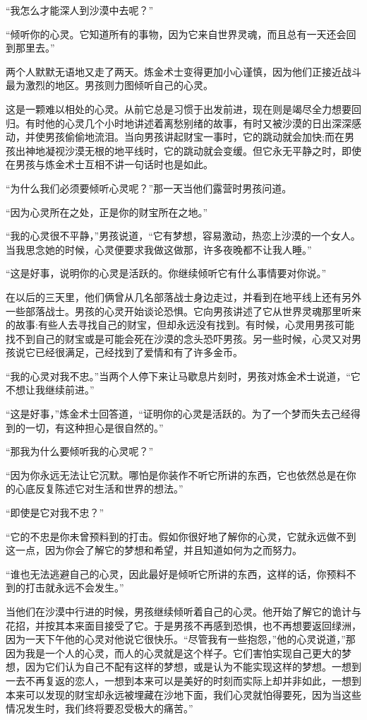 \documentclass[twoside,openany]{book}
\begin{document}
“我怎么才能深人到沙漠中去呢？”

“倾听你的心灵。它知道所有的事物，因为它来自世界灵魂，而且总有一天还会回到那里去。”

两个人默默无语地又走了两天。炼金术士变得更加小心谨慎，因为他们正接近战斗最为激烈的地区。男孩则力图倾听自己的心灵。

这是一颗难以相处的心灵。从前它总是习惯于出发前进，现在则是竭尽全力想要回归。有时他的心灵几个小时地讲述着离愁别绪的故事，有时又被沙漠的日出深深感动，并使男孩偷偷地流泪。当向男孩讲起财宝一事时，它的跳动就会加快;而在男孩出神地凝视沙漠无根的地平线时，它的跳动就会变缓。但它永无平静之时，即使在男孩与炼金术士互相不讲一句话时也是如此。

“为什么我们必须要倾听心灵呢？”那一天当他们露营时男孩问道。

“因为心灵所在之处，正是你的财宝所在之地。”

“我的心灵很不平静，”男孩说道，“它有梦想，容易激动，热恋上沙漠的一个女人。当我思念她的时候，心灵便要求我做这做那，许多夜晚都不让我人睡。”

“这是好事，说明你的心灵是活跃的。你继续倾听它有什么事情要对你说。”

在以后的三天里，他们俩曾从几名部落战士身边走过，并看到在地平线上还有另外一些部落战士。男孩的心灵开始谈论恐惧。它向男孩讲述了它从世界灵魂那里听来的故事:有些人去寻找自己的财宝，但却永远没有找到。有时候，心灵用男孩可能找不到自己的财宝或是可能会死在沙漠的念头恐吓男孩。另一些时候，心灵又对男孩说它已经很满足，己经找到了爱情和有了许多金币。

“我的心灵对我不忠。”当两个人停下来让马歇息片刻时，男孩对炼金术士说道，“它不想让我继续前进。”

“这是好事，”炼金术士回答道，“证明你的心灵是活跃的。为了一个梦而失去己经得到的一切，有这种担心是很自然的。”

“那我为什么要倾听我的心灵呢？”

“因为你永远无法让它沉默。哪怕是你装作不听它所讲的东西，它也依然总是在你的心底反复陈述它对生活和世界的想法。”

“即使是它对我不忠？”

“它的不忠是你未曾预料到的打击。假如你很好地了解你的心灵，它就永远做不到这一点，因为你会了解它的梦想和希望，并且知道如何为之而努力。

“谁也无法逃避自己的心灵，因此最好是倾听它所讲的东西，这样的话，你预料不到的打击就永远不会发生。”

当他们在沙漠中行进的时候，男孩继续倾听着自己的心灵。他开始了解它的诡计与花招，并按其本来面目接受了它。于是男孩不再感到恐惧，也不再想要返回绿洲，因为一天下午他的心灵对他说它很快乐。“尽管我有一些抱怨，”他的心灵说道，”那因为我是一个人的心灵，而人的心灵就是这个样子。它们害怕实现自己更大的梦想，因为它们认为自己不配有这样的梦想，或是认为不能实现这样的梦想。一想到一去不再复返的恋人，一想到本来可以是美好的时刻而实际上却并非如此，一想到本来可以发现的财宝却永远被埋藏在沙地下面，我们心灵就怕得要死，因为当这些情况发生时，我们终将要忍受极大的痛苦。”
\end{document}
